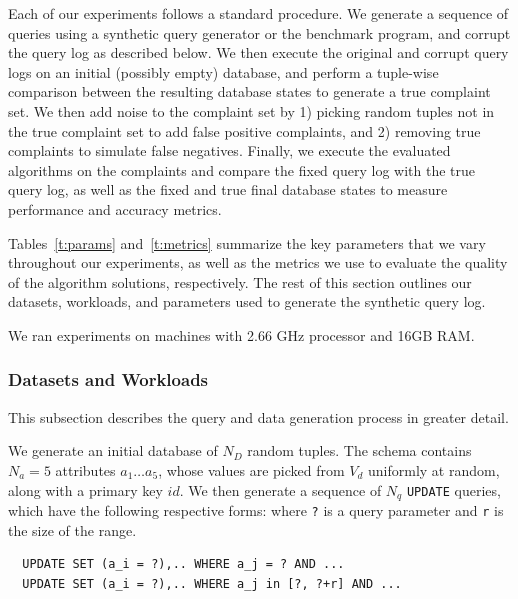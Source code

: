 

Each of our experiments follows a standard procedure.  
We generate a sequence of queries using a synthetic query generator or 
the benchmark program, and corrupt the query log as described below. 
We then execute the original and corrupt query logs on an initial (possibly empty) database,
and perform a tuple-wise comparison between the resulting database states 
to generate a true complaint set.  
We then add noise to the complaint set by 1) picking random tuples not in the true
complaint set to add false positive complaints, and 2) removing true complaints to simulate false negatives.
Finally, we execute the evaluated algorithms on the complaints and compare the fixed
query log with the true query log, as well as the fixed and true
final database states to measure performance and accuracy metrics.

Tables~\ref{t:params} and~\ref{t:metrics} summarize the key parameters that
we vary throughout our experiments, as well as the metrics we use to evaluate
the quality of the algorithm solutions, respectively.  The rest of this section
outlines our datasets, workloads, and parameters used to generate the synthetic query log.

{
\color{blue} 
We ran experiments on machines with 
2.66 GHz processor and 16GB RAM. 
}

\subsubsection{Datasets and Workloads}

This subsection describes the query and data generation process in greater detail.

 \label{sec:syntheticgen}
{\color{blue} We generate an initial database of $N_D$ random tuples.  
The schema contains $N_a=5$ attributes $a_1\ldots a_5$, whose values are
picked from $V_d$ uniformly at random, along with a primary key $id$.
We then generate a sequence of $N_q$ \texttt{UPDATE} queries, which
have the following respective forms: where \verb|?| is a query parameter 
and \verb|r| is the size of the range. }

{\scriptsize
\begin{verbatim}
  UPDATE SET (a_i = ?),.. WHERE a_j = ? AND ...
  UPDATE SET (a_i = ?),.. WHERE a_j in [?, ?+r] AND ...
\end{verbatim}
}

